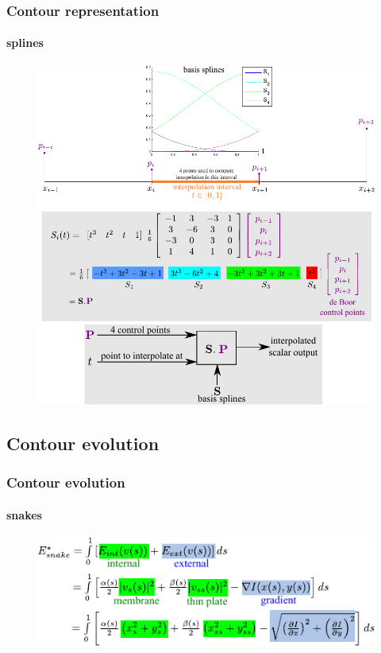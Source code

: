 \begin{frame}[plain]
\frametitle{Contour representation}
\framesubtitle{splines}
	\begin{changemargin}{-1.3in}{0in} 
		\begin{figure}
			\includegraphics[height=0.85\textheight]{figs/theory_curves_UniformCubicBsplines.pdf}
		\end{figure}
	\end{changemargin}
\end{frame}



\subsection{Contour evolution}
\begin{frame}
\frametitle{Contour evolution}
\framesubtitle{snakes}
\logoCSIPCPL\mypagenum
	\begin{figure}
		\includegraphics[width=1.0\textwidth]{figs/theory_curves_snakes.pdf}
	\end{figure}
\end{frame}

